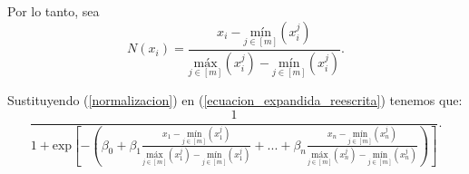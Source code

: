 \documentclass{article}
\begin{document}
\begin{flushleft}
Por lo tanto, sea 
\begin{equation} \label{normalizacion} N\left ( x_{i} \right )= \frac{x_{i} - \underset{j\in [m ]}{\mbox{mín}}\left (  x_{i}^{j}\right )}{\underset{j\in [m ]}{\mbox{máx}}\left (  x_{i}^{j}\right )-\underset{j\in [m ]}{\mbox{mín}}\left (  x_{i}^{j}\right )} .
\end{equation}

Sustituyendo (\ref{normalizacion}) en (\ref{ecuacion_expandida_reescrita}) tenemos que: 
\begin{equation} \label{ecuacion_chorizo}
    \frac{1}{1+\mbox{exp}\left [ -\left ( \beta _{0} + \beta _{1}\frac{x_{1}- \underset{j\in [m]}{\mbox{mín}}\left (x_{1}^{j}\right )}{\underset{j\in [m ]}{\mbox{máx}}\left (x_{1}^{j}\right )-\underset{j\in [m]}{\mbox{mín}}\left (  x_{1}^{j}\right )}+...+\beta_{n}\frac{x_{n} - \underset{j\in [m]}{\mbox{mín}}\left (  x_{n}^{j}\right )}{\underset{j\in [m]}{\mbox{máx}}\left (  x_{n}^{j}\right )-\underset{j\in [m]}{\mbox{mín}}\left (  x_{n}^{j}\right )}\right ) \right ]} .
\end{equation}


\newpage


\end{flushleft}
\end{document}
